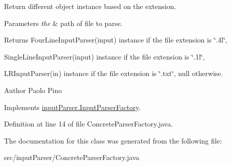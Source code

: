Return different object instance based on the extension. 


\begin{DoxyParams}{Parameters}
{\em the} & path of file to parse. \\
\hline
\end{DoxyParams}
\begin{DoxyReturn}{Returns}
Four\-Line\-Input\-Parser(input) instance if the file extension is \char`\"{}.\-4l\char`\"{},\par
 Single\-Line\-Input\-Parser(input) instance if the file extension is \char`\"{}.\-1l\char`\"{},\par
 L\-R\-Input\-Parser(in) instance if the file extension is \char`\"{}.\-txt\char`\"{}, null otherwise. 
\end{DoxyReturn}
\begin{DoxyAuthor}{Author}
Paolo Pino 
\end{DoxyAuthor}


Implements \hyperlink{classinput_parser_1_1_input_parser_factory_a48971c2679b589f34a7051e795d48c49}{input\-Parser.\-Input\-Parser\-Factory}.



Definition at line 14 of file Concrete\-Parser\-Factory.\-java.



The documentation for this class was generated from the following file\-:\begin{DoxyCompactItemize}
\item 
src/input\-Parser/Concrete\-Parser\-Factory.\-java\end{DoxyCompactItemize}

